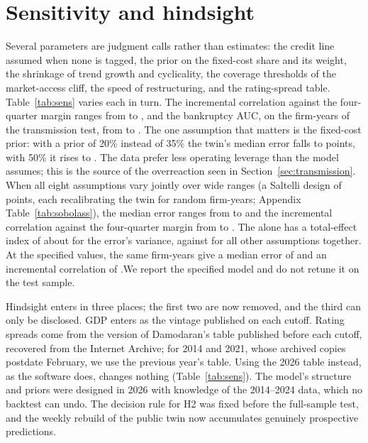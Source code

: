 \documentclass[11pt]{article}
\begin{document}
\section{Sensitivity and hindsight}\label{sec:sensitivity}
Several parameters are judgment calls rather than estimates: the credit line assumed when none is tagged, the prior on the fixed-cost share and its weight, the shrinkage of trend growth and cyclicality, the coverage thresholds of the market-access cliff, the speed of restructuring, and the rating-spread table. Table~\ref{tab:sens} varies each in turn. The incremental correlation against the four-quarter margin ranges from \SensIncrLo{} to \SensIncrHi, and the bankruptcy AUC, on the firm-years of the transmission test, from \SensBkLo{} to \SensBkHi. The one assumption that matters is the fixed-cost prior: with a prior of 20\% instead of 35\% the twin's median error falls to \SensMaeLow{} points, with 50\% it rises to \SensMaeHigh. The data prefer less operating leverage than the model assumes; this is the source of the overreaction seen in Section~\ref{sec:transmission}. \ifdefined\SobN When all eight assumptions vary jointly over wide ranges (a Saltelli design of
\SobPoints{} points, each recalibrating the twin for \SobN{} random firm-years; Appendix Table~\ref{tab:sobolass}), the
median error ranges from \SobMaeMin{} to \SobMaeMax{} and the incremental correlation against the four-quarter margin from
\SobIncrMin{} to \SobIncrMax{}. The \SobTopLabel{} alone has a total-effect index of about \SobTopST{} for the error's
variance, against \SobRestST{} for all other assumptions together. At the specified values, the same firm-years give a median error of \SobSpecMae{} and an incremental correlation of \SobSpecIncr.\fi We report the specified model and do not retune it on the test sample.

Hindsight enters in three places; the first two are now removed, and the third can only be disclosed. GDP enters as the vintage published on each cutoff. Rating spreads come from the version of Damodaran's table published before each cutoff, recovered from the Internet Archive; for 2014 and 2021, whose archived copies postdate February, we use the previous year's table. Using the 2026 table instead, as the software does, changes nothing (Table~\ref{tab:sens}). The model's structure and priors were designed in 2026 with knowledge of the 2014--2024 data, which no backtest can undo. The decision rule for H2 was fixed before the full-sample test, and the weekly rebuild of the public twin now accumulates genuinely prospective predictions.
\end{document}
